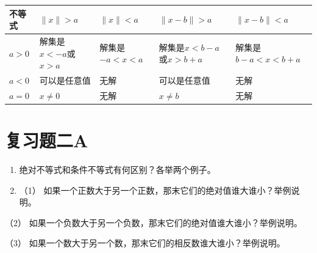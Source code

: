 {\def\LTcaptype{none} %
\begin{longtable}[]{@{}
  >{\raggedright\arraybackslash}p{}
  >{\raggedright\arraybackslash}p{}
  >{\raggedright\arraybackslash}p{}
  >{\raggedright\arraybackslash}p{}
  >{\raggedright\arraybackslash}p{}@{}}
\toprule\noalign{}
\begin{minipage}[b]{\linewidth}\raggedright
不等式
\end{minipage} & \begin{minipage}[b]{\linewidth}\raggedright
\(\|x\| > a\)
\end{minipage} & \begin{minipage}[b]{\linewidth}\raggedright
\(\|x\| < a\)
\end{minipage} & \begin{minipage}[b]{\linewidth}\raggedright
\(\|x - b\| > a\)
\end{minipage} & \begin{minipage}[b]{\linewidth}\raggedright
\(\|x - b\| < a\)
\end{minipage} \\
\midrule\noalign{}
\endhead
\bottomrule\noalign{}
\endlastfoot
\(a > 0\) & 解集是\(x < -a\)或\(x > a\) & 解集是\(-a < x < a\) &
解集是\(x < b - a\)或\(x > b + a\) & 解集是\(b - a < x < b + a\) \\
\(a < 0\) & 可以是任意值 & 无解 & 可以是任意值 & 无解 \\
\(a = 0\) & \(x \neq 0\) & 无解 & \(x \neq b\) & 无解 \\
\end{longtable}
}

\section{复习题二A}

\begin{enumerate}
\item
  绝对不等式和条件不等式有何区别？各举两个例子。
\item
  （1） 如果一个正数大于另一个正数，那末它们的绝对值谁大谁小？举例说明。
\end{enumerate}

（2） 如果一个负数大于另一个负数，那末它们的绝对值谁大谁小？举例说明。

（3） 如果一个数大于另一个数，那末它们的相反数谁大谁小？举例说明。

